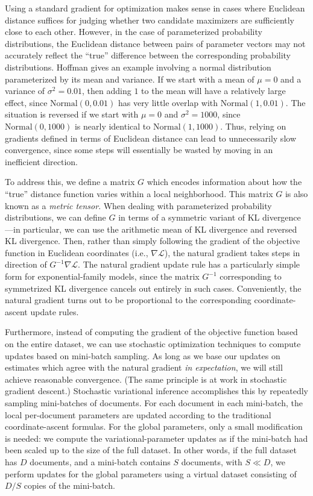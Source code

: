 \documentclass{article}
\begin{document}
Using a standard gradient for optimization makes sense in cases where Euclidean distance suffices for judging whether two candidate maximizers are sufficiently close to each other.
However, in the case of parameterized probability distributions, the Euclidean distance between pairs of parameter vectors may not accurately reflect the ``true'' difference between the corresponding probability distributions.
Hoffman \cite{hoffman2013stochastic} gives an example involving a normal distribution parameterized by its mean and variance.
If we start with a mean of $\mu = 0$ and a variance of $\sigma^2 = 0.01$, then adding $1$ to the mean will have a relatively large effect, since $\mathrm{Normal}(0, 0.01)$ has very little overlap with $\mathrm{Normal}(1, 0.01)$.
The situation is reversed if we start with $\mu = 0$ and $\sigma^2 = 1000$, since $\mathrm{Normal}(0, 1000)$ is nearly identical to $\mathrm{Normal}(1, 1000)$.
Thus, relying on gradients defined in terms of Euclidean distance can lead to unnecessarily slow convergence, since some steps will essentially be wasted by moving in an inefficient direction.

To address this, we define a matrix $G$ which encodes information about how the ``true'' distance function varies within a local neighborhood.
This matrix $G$ is also known as a \emph{metric tensor}.
When dealing with parameterized probability distributions, we can define $G$ in terms of a symmetric variant of KL divergence---in particular, we can use the arithmetic mean of KL divergence and reversed KL divergence.
Then, rather than simply following the gradient of the objective function in Euclidean coordinates (i.e., $\nabla \mathcal L$), the natural gradient takes steps in direction of $G^{-1} \nabla \mathcal L$.
The natural gradient update rule has a particularly simple form for exponential-family models, since the matrix $G^{-1}$ corresponding to symmetrized KL divergence cancels out entirely in such cases.
Conveniently, the natural gradient turns out to be proportional to the corresponding coordinate-ascent update rules.

Furthermore, instead of computing the gradient of the objective function based on the entire dataset, we can use stochastic optimization techniques to compute updates based on mini-batch sampling.
As long as we base our updates on estimates which agree with the natural gradient \emph{in expectation}, we will still achieve reasonable convergence.
(The same principle is at work in stochastic gradient descent.)
Stochastic variational inference accomplishes this by repeatedly sampling mini-batches of documents.
For each document in each mini-batch, the local per-document parameters are updated according to the traditional coordinate-ascent formulas.
For the global parameters, only a small modification is needed: we compute the variational-parameter updates as if the mini-batch had been scaled up to the size of the full dataset.
In other words, if the full dataset has $D$ documents, and a mini-batch contains $S$ documents, with $S \ll D$, we perform updates for the global parameters using a virtual dataset consisting of $D / S$ copies of the mini-batch.
\end{document}
